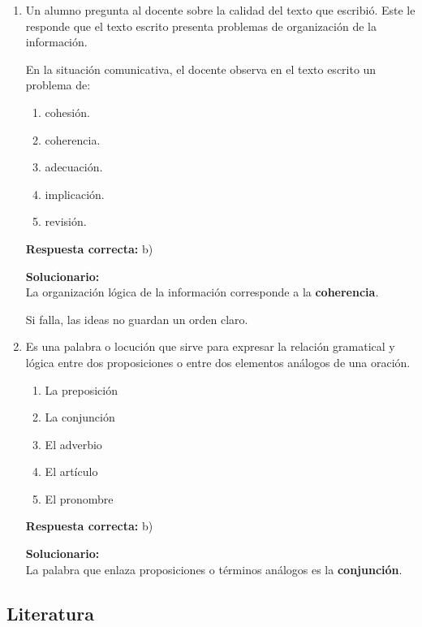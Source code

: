 \begin{enumerate}
	
	\vspace{6mm}
	
	\item Un alumno pregunta al docente sobre la calidad del texto que escribió. Este le responde que el texto escrito presenta problemas de organización de la información.
	
	En la situación comunicativa, el docente observa en el texto escrito un problema de:
	\begin{enumerate}[label=\alph*)]
		\item cohesión.
		\item coherencia.
		\item adecuación.
		\item implicación.
		\item revisión.
	\end{enumerate}
	\textbf{Respuesta correcta:} b)
	
	\vspace{2mm}
	\textbf{Solucionario:}\\
	La organización lógica de la información corresponde a la \textbf{coherencia}.
	
	Si falla, las ideas no guardan un orden claro.
	

	
	\vspace{6mm}
	
	\item Es una palabra o locución que sirve para expresar la relación gramatical y lógica entre dos proposiciones o entre dos elementos análogos de una oración.
	\begin{enumerate}[label=\alph*)]
		\item La preposición
		\item La conjunción
		\item El adverbio
		\item El artículo
		\item El pronombre
	\end{enumerate}
	\textbf{Respuesta correcta:} b)
	
	\vspace{2mm}
	\textbf{Solucionario:}\\
	La palabra que enlaza proposiciones o términos análogos es la \textbf{conjunción}.
	

	
	\vspace{6mm}
\end{enumerate}

\subsection*{Literatura}

